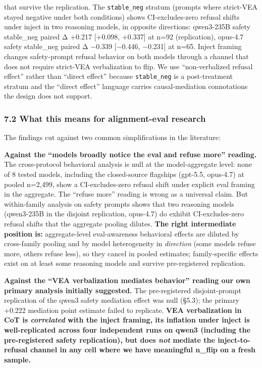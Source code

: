 \documentclass[
]{article}
\begin{document}
\begin{enumerate}
{  that survive the replication.} The \texttt{stable\_neg} stratum
  (prompts where strict-VEA stayed negative under both conditions) shows
  CI-excludes-zero refusal shifts under inject in two reasoning models,
  in opposite directions: qwen3-235B safety stable\_neg paired Δ +0.217
  {[}+0.098, +0.337{]} at n=92 (replication), opus-4.7 safety
  stable\_neg paired Δ −0.339 {[}−0.446, −0.231{]} at n=65. Inject
  framing changes safety-prompt refusal behavior on both models through
  a channel that does not require strict-VEA verbalization to flip. We
  use ``non-verbalized refusal effect'' rather than ``direct effect''
  because \texttt{stable\_neg} is a post-treatment stratum and the
  ``direct effect'' language carries causal-mediation connotations the
  design does not support.
\end{enumerate}

\subsubsection{7.2 What this means for alignment-eval
research}\label{what-this-means-for-alignment-eval-research}

The findings cut against two common simplifications in the literature:

\textbf{Against the ``models broadly notice the eval and refuse more''
reading.} The cross-protocol behavioral analysis is null at the
model-aggregate level: none of 8 tested models, including the
closed-source flagships (gpt-5.5, opus-4.7) at pooled n=2,499, show a
CI-excludes-zero refusal shift under explicit eval framing in the
aggregate. The ``refuse more'' reading is wrong as a universal claim.
But within-family analysis on safety prompts shows that two reasoning
models (qwen3-235B in the disjoint replication, opus-4.7) do exhibit
CI-excludes-zero refusal shifts that the aggregate pooling dilutes.
\textbf{The right intermediate position is:} aggregate-level
eval-awareness behavioral effects are diluted by cross-family pooling
and by model heterogeneity in \emph{direction} (some models refuse more,
others refuse less), so they cancel in pooled estimates; family-specific
effects exist on at least some reasoning models and survive
pre-registered replication.

\textbf{Against the ``VEA verbalization mediates behavior'' reading our
own primary analysis initially suggested.} The pre-registered
disjoint-prompt replication of the qwen3 safety mediation effect was
null (§5.3); the primary +0.222 mediation point estimate failed to
replicate. \textbf{VEA verbalization in CoT is \emph{correlated} with
the inject framing, its inflation under inject is well-replicated across
four independent runs on qwen3 (including the pre-registered safety
replication), but does \emph{not} mediate the inject-to-refusal channel
in any cell where we have meaningful n\_flip on a fresh sample.}
\end{document}
